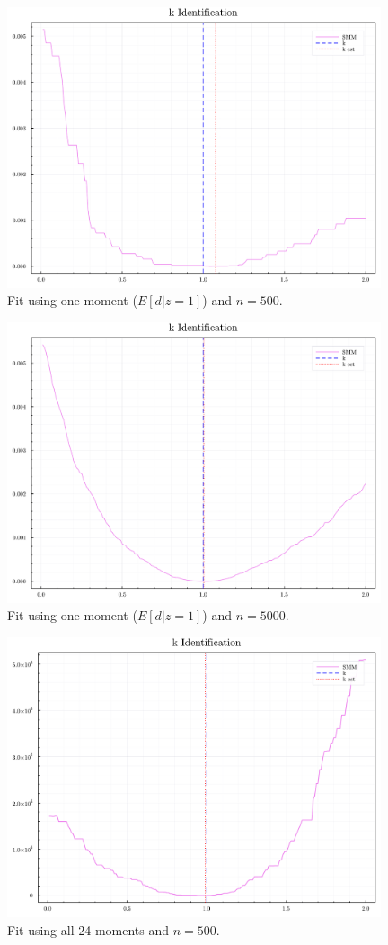 \documentclass[12pt]{article}
\theoremstyle{definition}
\begin{document}
 
\begin{figure}[h]
\centering
\includegraphics[width=11cm]{MonteCarlo_final/imgs/kfit_n500_m1_d_z=1.pdf}
\caption{Fit using one moment ($E[d|z=1]$) and $n = 500.$}
\end{figure}

\begin{figure}[h]
\centering
\includegraphics[width=11cm]{MonteCarlo_final/imgs/kfit_n5000_m1_d_z=1.pdf}
\caption{Fit using one moment ($E[d|z=1]$) and $n = 5000.$}
\end{figure}

\begin{figure}[h]
\centering
\includegraphics[width=11cm]{MonteCarlo_final/imgs/kfit_n500_m24.pdf}
\caption{Fit using all 24 moments and $n = 500.$}
\end{figure}
\end{document}
